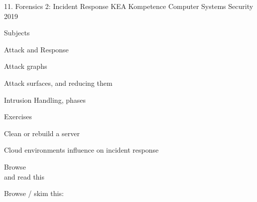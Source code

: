 \documentclass[Screen16to9,17pt]{foils}
\begin{document}
\mytitlepage
{11. Forensics 2: Incident Response}
{KEA Kompetence Computer Systems Security 2019}



\begin{list1}
\item Subjects
\begin{list2}
\item Attack and Response
\item Attack graphs
\item Attack surfaces, and reducing them
\item Intrusion Handling, phases
\end{list2}
\item Exercises
\begin{list2}
\item Clean or rebuild a server
\item Cloud environments influence on incident response
\end{list2}
\end{list1}




\begin{list1}
\item Browse\\

and read this\\

\item Browse / skim this:\\

\end{list1}












\slidenext
\end{document}
